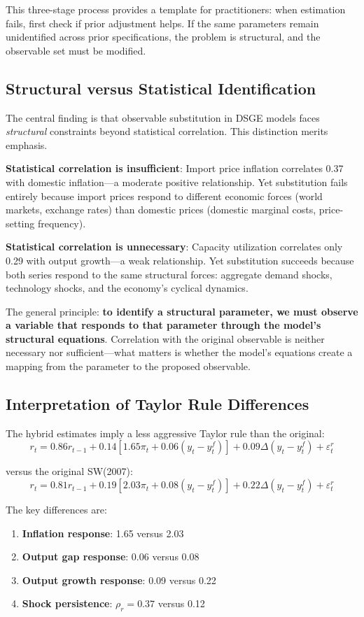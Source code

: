 \documentclass[12pt]{article}
\begin{document}
This three-stage process provides a template for practitioners: when estimation fails, first check if prior adjustment helps. If the same parameters remain unidentified across prior specifications, the problem is structural, and the observable set must be modified.

\subsection{Structural versus Statistical Identification}

The central finding is that observable substitution in DSGE models faces \textit{structural} constraints beyond statistical correlation. This distinction merits emphasis.

\textbf{Statistical correlation is insufficient}: Import price inflation correlates 0.37 with domestic inflation---a moderate positive relationship. Yet substitution fails entirely because import prices respond to different economic forces (world markets, exchange rates) than domestic prices (domestic marginal costs, price-setting frequency).

\textbf{Statistical correlation is unnecessary}: Capacity utilization correlates only 0.29 with output growth---a weak relationship. Yet substitution succeeds because both series respond to the same structural forces: aggregate demand shocks, technology shocks, and the economy's cyclical dynamics.

The general principle: \textbf{to identify a structural parameter, we must observe a variable that responds to that parameter through the model's structural equations}. Correlation with the original observable is neither necessary nor sufficient---what matters is whether the model's equations create a mapping from the parameter to the proposed observable.

\subsection{Interpretation of Taylor Rule Differences}

The hybrid estimates imply a less aggressive Taylor rule than the original:
\[
r_t = 0.86 r_{t-1} + 0.14[1.65\pi_t + 0.06(y_t - y^f_t)] + 0.09\Delta(y_t - y^f_t) + \varepsilon^r_t
\]

versus the original SW(2007):
\[
r_t = 0.81 r_{t-1} + 0.19[2.03\pi_t + 0.08(y_t - y^f_t)] + 0.22\Delta(y_t - y^f_t) + \varepsilon^r_t
\]

The key differences are:
\begin{enumerate}
    \item \textbf{Inflation response}: 1.65 versus 2.03
    \item \textbf{Output gap response}: 0.06 versus 0.08
    \item \textbf{Output growth response}: 0.09 versus 0.22
    \item \textbf{Shock persistence}: $\rho_r = 0.37$ versus 0.12
\end{enumerate}
\end{document}

